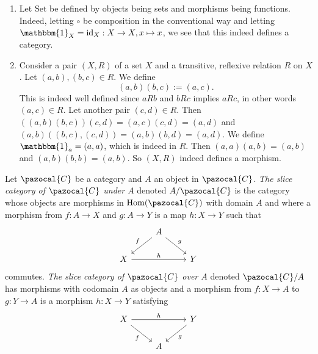 \begin{example}\label{BasicExamplesOfCategories}
    \begin{enumerate}
        \item Let $\mathrm{Set}$ be defined by objects being sets and morphisms being functions. Indeed, letting $\circ$ be composition in the conventional way and letting $\mathbbm{1}_X = \mathrm{id}_X: X\rightarrow X, x\mapsto x$, we see that this indeed defines a category. 
        \item Consider a pair $(X,R)$ of a set $X$ and a transitive, reflexive relation $R$ on $X$. Let $(a,b),(b,c)\in R$. We define 
        $$(a,b)(b,c) := (a,c).$$
        This is indeed well defined since $a R b$ and $bR c$ implies $a R c$, in other words $(a,c)\in R$. Let another pair $(c,d)\in R$. Then $((a,b)(b,c))(c,d)= (a,c)(c,d) = (a,d)$ and $(a,b)((b,c),(c,d))=(a,b)(b,d)=(a,d)$. We define $\mathbbm{1}_a = (a,a)$, which is indeed in $R$. Then $(a,a)(a,b)=(a,b)$ and $(a,b)(b,b)=(a,b)$. So $(X,R)$ indeed defines a morphism. 
    \end{enumerate}
\end{example}
\begin{definition}
    Let $\pazocal{C}$ be a category and $A$ an object in $\pazocal{C}$. \textit{The slice category of $\pazocal{C}$ under $A$} denoted $A/\pazocal{C}$ is the category whose objects are morphisms in $\Hom(\pazocal{C})$ with domain $A$ and where a morphism from $f: A \rightarrow X$ and $g : A \rightarrow Y $ is a map $h : X\rightarrow Y$ such that 
    $$\begin{tikzcd}
       & A \arrow[ld, "f"' ] \arrow[rd, "g"]\\
        X \arrow{rr}{h} & & Y
    \end{tikzcd}$$
    commutes. \textit{The slice category of $\pazocal{C}$ over $A$} denoted $\pazocal{C}/A$ has morphisms with codomain $A$ as objects and a morphism from $f : X \rightarrow A$ to $g : Y\rightarrow A$ is a morphism $h : X \rightarrow Y$ satisfying
    $$\begin{tikzcd}
        X \arrow[rd, "f"'] \arrow[rr, "h"] & & Y\arrow[ld, "g"]\\
        & A 
    \end{tikzcd}$$
\end{definition}
